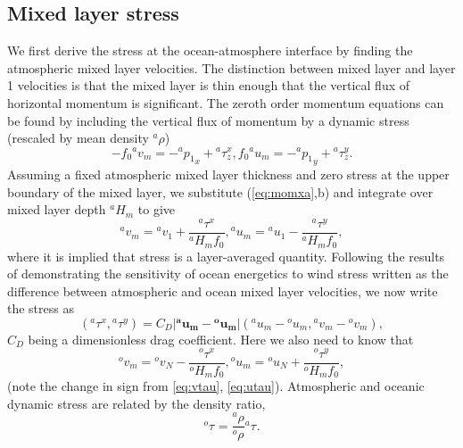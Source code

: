 \documentclass[11pt, a4paper,twoside]{article}
\newcommand{\rhb}[1]{{{}^{#1}\rho}}
\newcommand{\p}[2]{{{}^{#1}p_{#2}}}
\newcommand{\uu}[2]{{{}^{#1}u_{#2}}}
\newcommand{\vv}[2]{{{}^{#1}v_{#2}}}
\newcommand{\HH}[2]{{{}^{#1}H_{#2}}}
\newcommand{\tx}[2]{{}^{#1}\tau^{#2}}
\newcommand{\vc}[1]{\mathbf{#1}}
\numberwithin{equation}{section}
\begin{document}
\subsection{Mixed layer stress}\label{sec:mix1}
We first derive the stress at the ocean-atmosphere interface by finding the atmospheric mixed layer velocities.
The distinction between mixed layer and layer 1 velocities is that the mixed layer is thin enough that the vertical flux of horizontal momentum is significant.
The zeroth order momentum equations can be found by including the vertical flux of momentum by a dynamic stress (rescaled by mean density $\rhb{a}$)
\begin{subequations}
\begin{equation}
- f_0 \vv{a}{m} = -\p{a}{1}_x + \tx{a}{x}_z,
\end{equation}
\begin{equation}
 f_0 \uu{a}{m} = -\p{a}{1}_y + \tx{a}{y}_z.
\end{equation}
\end{subequations}
Assuming a fixed atmospheric mixed layer thickness and zero stress at the upper boundary of the mixed layer, we substitute (\ref{eq:momxa},b) and integrate over mixed layer depth $\HH{a}{m}$ to give
\begin{subequations}
\begin{equation}\label{eq:vtau}
\vv{a}{m} = \vv{a}{1} + \frac{\tx{a}{x}}{\HH{a}{m}f_0},
\end{equation}
\begin{equation}\label{eq:utau}
\uu{a}{m} = \uu{a}{1} - \frac{\tx{a}{y}}{\HH{a}{m}f_0},
\end{equation}
\end{subequations}
where it is implied that stress is a layer-averaged quantity.
Following the results of \citet{duhaut:06} demonstrating the sensitivity of ocean energetics to wind stress written as the difference between atmospheric and ocean mixed layer velocities, we now write the stress as
\begin{equation}\label{eq:stress2}
(\tx{a}{x},\tx{a}{y}) = C_D \lvert \vc{\uu{a}{m}} - \vc{\uu{o}{m}} \rvert (\uu{a}{m} - \uu{o}{m},\vv{a}{m} - \vv{o}{m}),
\end{equation}
$C_D$ being a dimensionless drag coefficient.
Here we also need to know that 
\begin{subequations}
\begin{equation}\label{eq:vtauoc}
\vv{o}{m} = \vv{o}{N} - \frac{\tx{o}{x}}{\HH{o}{m}f_0},
\end{equation}
\begin{equation}\label{eq:utauoc}
\uu{o}{m} = \uu{o}{N} + \frac{\tx{o}{y}}{\HH{o}{m}f_0},
\end{equation}
\end{subequations}
(note the change in sign from \ref{eq:vtau}, \ref{eq:utau}).
Atmospheric and oceanic dynamic stress are related by the density ratio,
\begin{equation}\label{eq:ocstr2}
\tx{o}{} =  \frac{\rhb{a}}{\rhb{o}}\tx{a}{}.
\end{equation}
\end{document}
